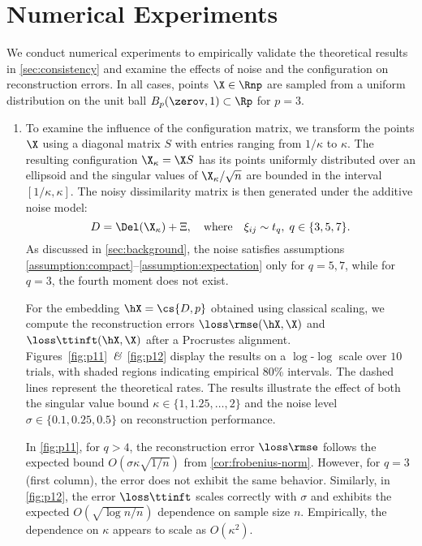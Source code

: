 \documentclass[10pt]{article}
\begin{document}
\section{Numerical Experiments}
\label{sec:experiments}

We conduct numerical experiments to empirically validate the theoretical results in \cref{sec:consistency} and examine the effects of noise and the configuration on reconstruction errors. In all cases, points $\X \in \Rnp$ are sampled from a uniform distribution on the unit ball $B_p(\zerov, 1) \subset \Rp$ for $p=3$.

\begin{enumerate}[label=\textbf{Experiment \arabic*.}, ref=Experiment \arabic*, leftmargin=*, itemindent=8em]
    \item\label{exp:1} 
    To examine the influence of the configuration matrix, we transform the points $\X$ using a diagonal matrix $S$ with entries ranging from $1/\kappa$ to $\kappa$. The resulting configuration $\X_\kappa = \X S$ has its points uniformly distributed over an ellipsoid and the singular values of $\X_\kappa/\sqrt{n}$ are bounded in the interval $[1/\kappa, \kappa]$. The noisy dissimilarity matrix is then generated under the additive noise model:
    $$
    D = \Del(\X_\kappa) + \Xi, \quad \text{where} \quad \xi_{ij} \sim t_q, \; q \in \{3, 5, 7\}.
    $$
    As discussed in \cref{sec:background}, the noise satisfies assumptions \ref{assumption:compact}--\ref{assumption:expectation} only for $q=5, 7$, while for $q=3$, the fourth moment does not exist.

    \qquad For the embedding $\hX = \cs{D, p}$ obtained using classical scaling, we compute the reconstruction errors $\loss\rmse(\hX, \X)$ and $\loss\ttinft(\hX, \X)$ after a Procrustes alignment. Figures~\ref{fig:p11}~\textit{\&}~\ref{fig:p12} display the results on a $\log$-$\log$ scale over $10$ trials, with shaded regions indicating empirical 80\% intervals. The dashed lines represent the theoretical rates. The results illustrate the effect of both the singular value bound $\kappa \in \{1, 1.25, \dots, 2\}$  and the noise level $\sigma \in \{0.1, 0.25, 0.5\}$ on reconstruction performance.

    \qquad In \cref{fig:p11}, for $q > 4$, the reconstruction error $\loss\rmse$ follows the expected bound $O(\sigma\kappa\sqrt{1/n})$ from \cref{cor:frobenius-norm}. However, for $q = 3$ (first column), the error does not exhibit the same behavior. Similarly, in \cref{fig:p12}, the error $\loss\ttinft$ scales correctly with $\sigma$ and exhibits the expected $O(\sqrt{\log{n}/n})$ dependence on sample size $n$. Empirically, the dependence on $\kappa$ appears to scale as $O(\kappa^2)$.


\end{enumerate}
\end{document}
